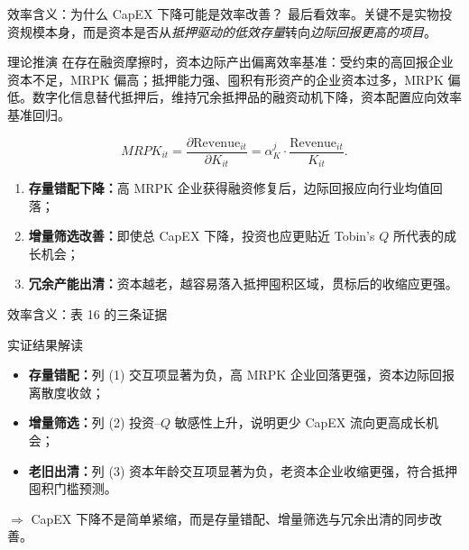 \begin{frame}{效率含义：为什么 CapEX 下降可能是效率改善？}
  最后看效率。关键不是实物投资规模本身，而是资本是否从\emph{抵押驱动的低效存量}转向\emph{边际回报更高的项目}。

  \begin{methodbox}{理论推演}
    \footnotesize
    在存在融资摩擦时，资本边际产出偏离效率基准：受约束的高回报企业资本不足，MRPK 偏高；抵押能力强、囤积有形资产的企业资本过多，MRPK 偏低。数字化信息替代抵押后，维持冗余抵押品的融资动机下降，资本配置应向效率基准回归。
  \end{methodbox}

  \vspace{-0.3em}
  \[
    MRPK_{it}
    =
    \frac{\partial \text{Revenue}_{it}}{\partial K_{it}}
    =
    \alpha_K^j\cdot\frac{\text{Revenue}_{it}}{K_{it}}.
  \]
  \vspace{-0.8em}

  \begin{enumerate}\setlength\itemsep{0.25em}
    \item \textbf{存量错配下降：}高 MRPK 企业获得融资修复后，边际回报应向行业均值回落；
    \item \textbf{增量筛选改善：}即使总 CapEX 下降，投资也应更贴近 Tobin's $Q$ 所代表的成长机会；
    \item \textbf{冗余产能出清：}资本越老，越容易落入抵押囤积区域，贯标后的收缩应更强。
  \end{enumerate}
\end{frame}

\begin{frame}{效率含义：表 16 的三条证据}
  \vspace{-0.4em}
  

  \vspace{-0.2em}
  \begin{findingbox}{实证结果解读}
    \scriptsize
    \begin{itemize}\setlength\itemsep{0pt}
      \item \textbf{存量错配：}列 (1) 交互项显著为负，高 MRPK 企业回落更强，资本边际回报离散度收敛；
      \item \textbf{增量筛选：}列 (2) 投资--$Q$ 敏感性上升，说明更少 CapEX 流向更高成长机会；
      \item \textbf{老旧出清：}列 (3) 资本年龄交互项显著为负，老资本企业收缩更强，符合抵押囤积门槛预测。
    \end{itemize}
    \vspace{-0.25em}
    \centering $\Rightarrow$ CapEX 下降不是简单紧缩，而是存量错配、增量筛选与冗余出清的同步改善。
  \end{findingbox}
\end{frame}

